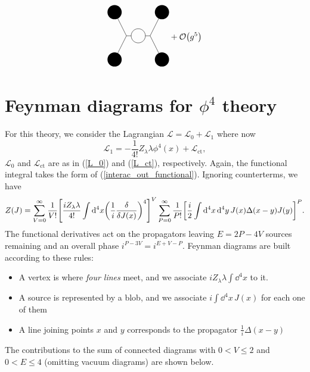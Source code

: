 \begin{equation}
\begin{aligned}
\begin{gathered}
\begin{tikzpicture}
                \fill[black] (1,1) circle (0.3 cm);
                 \fill[black] (-1,1) circle (0.3 cm);
                 \fill[black] (-1,-1) circle (0.3cm);
                 \fill[black] (1,-1) circle (0.3 cm);
                 \draw (-0.5,0) -- (-0.3,0);
                 \draw (0.3,0) -- (0.5,0);
                 \draw (-1,1) -- (-0.5,0);
                 \draw (1,1) -- (0.5,0);
                 \draw (-1,-1) -- (-0.5,0);
                 \draw (1,-1) -- (0.5,0);
                 \draw (0,0) circle (0.3 cm);
            \end{tikzpicture}
       \end{gathered}+\order{g^5}
    \end{aligned}
    \label{iWphi3}
\end{equation}
\section{Feynman diagrams for $\phi^4$ theory}
For this theory, we consider the Lagrangian $\mathcal{L}=\mathcal{L}_0+\mathcal{L}_1$ where now
\begin{equation}
    \mathcal{L}_1=-\frac{1}{4!}Z_\lambda\lambda\phi^4(x)+\mathcal{L}_{\text{ct}},
\end{equation}
$\mathcal{L}_0$ and $\mathcal{L}_{\text{ct}}$ are as in (\ref{L_0}) and (\ref{L_ct}), respectively. Again, the functional integral takes the form of (\ref{interac_out_functional}). Ignoring counterterms, we have
\begin{equation}
    Z(J)=\sum_{V=0}^\infty\frac{1}{V!}\qty[\frac{iZ_\lambda\lambda}{4!}\int\dd^4x\qty(\frac{1}{i}\fdv{J(x)})^4]^V\sum_{P=0}^\infty\frac{1}{P!}\qty[\frac{i}{2}\int\dd^4x\,\dd^4y\,J(x)\Delta(x-y)J(y)]^P.
\end{equation}
The functional derivatives act on the propagators leaving $E=2P-4V$ sources remaining and an overall phase $i^{P-3V}=i^{E+V-P}$. Feynman diagrams are built according to these rules:
\begin{itemize}
    \item A vertex is where \textit{four lines} meet, and we associate $iZ_\lambda\lambda\int\dd^4x$ to it.
    \item A source is represented by a blob, and we associate $i\int\dd^4x\,J(x)$ for each one of them
    \item A line joining points $x$ and $y$ corresponds to the propagator $\frac{1}{i}\Delta(x-y)$
\end{itemize} 
The contributions to the sum of connected diagrams with $0<V\leq2$ and $0<E\leq4$ (omitting vacuum diagrams) are shown below.\\
